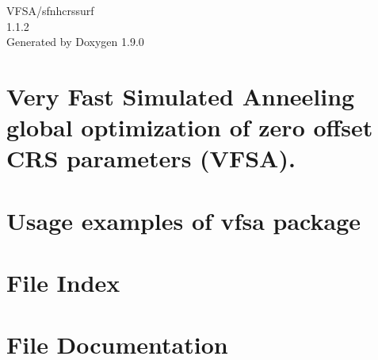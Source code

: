 \let\mypdfximage\pdfximage\def\pdfximage{\immediate\mypdfximage}\documentclass[twoside]{book}
\newcommand{\+}{\discretionary{\mbox{\scriptsize$\hookleftarrow$}}{}{}}
\newcommand{\clearemptydoublepage}{%
  \newpage{\pagestyle{empty}\cleardoublepage}%
}
\begin{document}
\raggedbottom

\hypersetup{pageanchor=false,
             bookmarksnumbered=true,
             pdfencoding=unicode
            }
\begin{titlepage}
\vspace*{7cm}
\begin{center}%
{\Large VFSA/sfnhcrssurf \\[1ex]\large 1.\+1.\+2 }\\
\vspace*{1cm}
{\large Generated by Doxygen 1.9.0}\\
\end{center}
\end{titlepage}
\clearemptydoublepage
{}
\tableofcontents
\clearemptydoublepage
{}
\hypersetup{pageanchor=true}

\chapter{Very Fast Simulated Anneeling global optimization of zero offset CRS parameters (VFSA).}
\label{md__home_dirack_madagascar-3_80_user_vfsa__r_e_a_d_m_e}

\chapter{Usage examples of vfsa package}
\label{md__home_dirack_madagascar-3_80_user_vfsa_usage_examples__r_e_a_d_m_e}

\chapter{File Index}

\chapter{File Documentation}


\backmatter
\newpage
{}
\clearemptydoublepage
{}
\printindex
\end{document}
